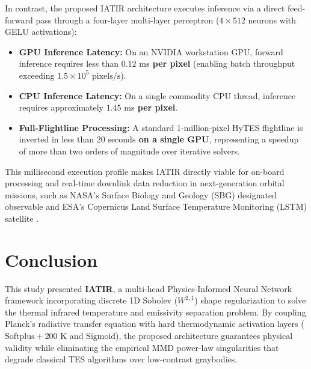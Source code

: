\documentclass[journal]{IEEEtran}
\begin{document}
In contrast, the proposed IATIR architecture executes inference via a direct feed-forward pass through a four-layer multi-layer perceptron ($4 \times 512$ neurons with GELU activations):
\begin{itemize}
    \item \textbf{GPU Inference Latency:} On an NVIDIA workstation GPU, forward inference requires less than \textbf{$0.12\text{ ms}$ per pixel} (enabling batch throughput exceeding $1.5 \times 10^5\text{ pixels/s}$).
    \item \textbf{CPU Inference Latency:} On a single commodity CPU thread, inference requires approximately \textbf{$1.45\text{ ms}$ per pixel}.
    \item \textbf{Full-Flightline Processing:} A standard 1-million-pixel HyTES flightline is inverted in less than \textbf{$20\text{ seconds}$ on a single GPU}, representing a speedup of more than two orders of magnitude over iterative solvers.
\end{itemize}

This millisecond execution profile makes IATIR directly viable for on-board processing and real-time downlink data reduction in next-generation orbital missions, such as NASA's Surface Biology and Geology (SBG) designated observable \cite{cawsenicholson2021nasa} and ESA's Copernicus Land Surface Temperature Monitoring (LSTM) satellite \cite{koetz2018high}.

\section{Conclusion}
This study presented \textbf{IATIR}, a multi-head Physics-Informed Neural Network framework incorporating discrete 1D Sobolev ($W^{2,1}$) shape regularization to solve the thermal infrared temperature and emissivity separation problem. By coupling Planck's radiative transfer equation with hard thermodynamic activation layers ($\text{Softplus} + 200\text{ K}$ and $\text{Sigmoid}$), the proposed architecture guarantees physical validity while eliminating the empirical MMD power-law singularities that degrade classical TES algorithms over low-contrast graybodies.
\end{document}
